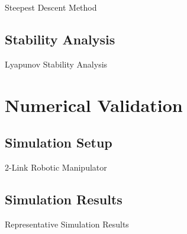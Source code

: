 \documentclass[8pt, aspectratio=169]{beamer}
\begin{document}
\begin{frame}{\insertsubsectionhead}{Steepest Descent Method}


\end{frame}
\subsection{Stability Analysis}

\begin{frame}{\insertsubsectionhead}{Lyapunov Stability Analysis}


\end{frame}

\section{Numerical Validation}

\subsection{Simulation Setup}
\begin{frame}{\insertsubsectionhead}{2-Link Robotic Manipulator}
    
\end{frame}

\subsection{Simulation Results}

\begin{frame}{Representative Simulation Results}

\end{frame}
\end{document}
